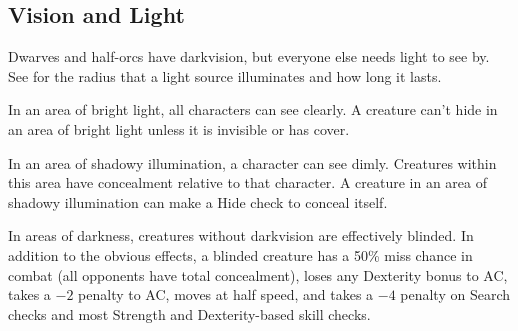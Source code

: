 \subsection{Vision and Light}


Dwarves and half-orcs have darkvision, but everyone else needs light to see by. See  for the radius that a light source illuminates and how long it lasts.

In an area of bright light, all characters can see clearly. A creature can't hide in an area of bright light unless it is invisible or has cover.

In an area of shadowy illumination, a character can see dimly. Creatures within this area have concealment relative to that character. A creature in an area of shadowy illumination can make a Hide check to conceal itself.

In areas of darkness, creatures without darkvision are effectively blinded. In addition to the obvious effects, a blinded creature has a 50\% miss chance in combat (all opponents have total concealment), loses any Dexterity bonus to AC, takes a $-2$ penalty to AC, moves at half speed, and takes a $-4$ penalty on Search checks and most Strength and Dexterity-based skill checks.

